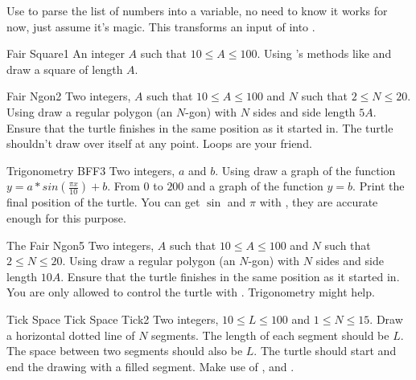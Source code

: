 \Note Use  to parse the list of numbers into a variable,
no need to know it works for now, just assume it's magic. This transforms an
input of  into \s{[1, 2, 3, 4, 5, 6]}.


\begin{task}{Fair Square}{1}
    \In
    An integer $A$ such that $10 \leq A \leq 100$.
    \Out
    Using 's methods like 
     and  draw a square of length $A$.
\end{task}

\begin{task}{Fair Ngon}{2}
    \In
    Two integers, $A$ such that $10 \leq A \leq 100$ and $N$
    such that $2 \leq N \leq 20$.
    \Out
    Using  draw a regular polygon (an $N$-gon) with $N$ sides and side
    length $5A$. Ensure that the turtle finishes in the same position as it started
    in. The turtle shouldn't draw over itself at any point.
    \Hint
    Loops are your friend.
\end{task}

\begin{task}{Trigonometry BFF}{3}
    \In
    Two integers, $a$ and $b$.
    \Out
    Using  draw a graph of the function $y = a * sin(\frac{\pi x}{10}) + b$.
    From $0$ to $200$ and a graph of the function $y = b$. Print the final position
    of the turtle.
    \Hint
    You can get $\sin$ and $\pi$ with , they are accurate
    enough for this purpose.
\end{task}

\begin{task}{The Fair Ngon}{5}
    \In
    Two integers, $A$ such that $10 \leq A \leq 100$ and $N$
    such that $2 \leq N \leq 20$.
    \Out
    Using  draw a regular polygon (an $N$-gon) with $N$ sides and side
    length $10A$. Ensure that the turtle finishes in the same position as it started
    in. You are only allowed to control the turtle with .
    \Hint
    Trigonometry might help.
\end{task}

\begin{task}{Tick Space Tick Space Tick}{2}
    \In
    Two integers, $10 \leq L \leq 100$ and $1 \leq N \leq 15$.
    \Out
    Draw a horizontal dotted line of $N$ segments. 
    The length of each segment should be $L$.
    The space between two segments should also be $L$.
    \Note
    The turtle should start and end the drawing with a filled segment.
    \Hint
    Make use of ,  and .
\end{task}


